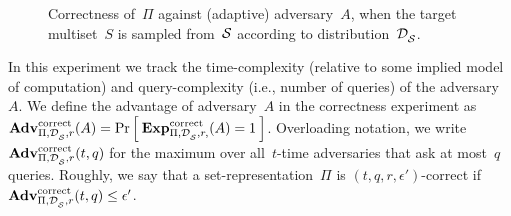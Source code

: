 \begin{figure}[htp]
\centering
{}
\caption{Correctness of~$\Pi$ against (adaptive) adversary~$A$, when
  the target multiset~$S$ is sampled from~${\cal S}$ according to distribution~$\mathcal{D}_{{\cal S}}^{}$.} 
\label{fig:correctness}
\end{figure}

In this experiment we track the time-complexity (relative to some
implied model of computation) and query-complexity (i.e., number of
queries) of the adversary~$A$.  
We define the advantage of adversary~$A$ in the correctness experiment as 
$\mathrm{\mathbf{Adv}}^{\mathrm{correct}}_{\Pi,\mathcal{D}_{{\cal S}}^{},r}(A) = \Pr\left[\: \mathrm{\mathbf{Exp}}^{\mathrm{correct}}_{\Pi,\mathcal{D}_{{\cal S}}^{}, r,}(A)=1 \:\right]$.
Overloading notation, we write $\mathrm{\mathbf{Adv}}^{\mathrm{correct}}_{\Pi,\mathcal{D}_{{\cal S}}^{},r}(t,q)$ for the maximum over all~$t$-time adversaries that ask at most~$q$ queries. Roughly, we say that a
set-representation~$\Pi$ is $(t,q,r,\epsilon')$-correct if $\mathrm{\mathbf{Adv}}^{\mathrm{correct}}_{\Pi,\mathcal{D}_{{\cal S}}^{},r}(t,q) \leq \epsilon'$.  




%
%

